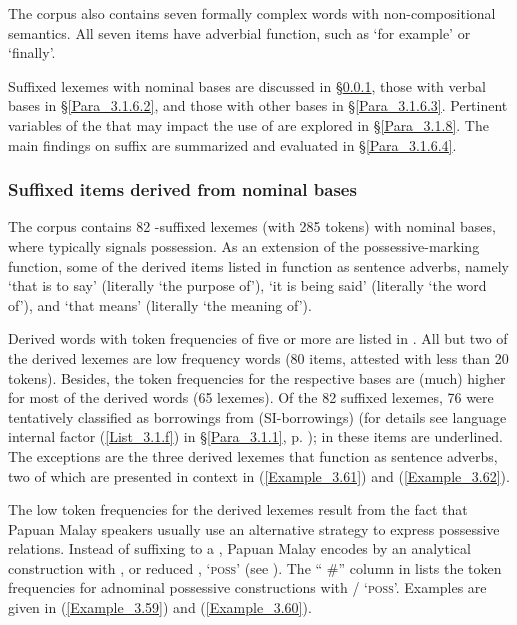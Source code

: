 The corpus also contains seven formally complex words with non-composi\-tion\-al semantics. All seven items have adverbial function, such as  ‘for example’ or  ‘finally’.



Suffixed lexemes with nominal bases are discussed in §\ref{Para_3.1.6.1}, those with verbal bases in §\ref{Para_3.1.6.2}, and those with other bases in §\ref{Para_3.1.6.3}. Pertinent variables of the  that may impact the use of  are explored in §\ref{Para_3.1.8}. The main findings on suffix  are summarized and evaluated in §\ref{Para_3.1.6.4}.


\subsubsection[Suffixed items derived from nominal bases]{Suffixed items derived from nominal bases}\label{Para_3.1.6.1}

The corpus contains 82 -suffixed lexemes (with 285 tokens) with nominal bases, where  typically signals possession. As an extension of the possessive-marking function, some of the derived items listed in  function as sentence adverbs, namely  ‘that is to say’ (literally ‘the purpose of’),  ‘it is being said’ (literally ‘the word of’), and  ‘that means’ (literally ‘the meaning of’).



Derived words with token frequencies of five or more are listed in . All but two of the derived lexemes are low frequency words (80 items, attested with less than 20 tokens). Besides, the token frequencies for the respective bases are (much) higher for most of the derived words (65 lexemes). Of the 82 suffixed lexemes, 76 were tentatively classified as borrowings from  (SI-borrowings) (for details see language internal factor (\ref{List_3.1.f}) in §\ref{Para_3.1.1}, p. \pageref{List_3.1.f}); in  these items are underlined. The exceptions are the three derived lexemes that function as sentence adverbs, two of which are presented in context in (\ref{Example_3.61}) and (\ref{Example_3.62}).



The low token frequencies for the derived lexemes result from the fact that Papuan Malay speakers usually use an alternative strategy to express possessive relations. Instead of suffixing  to a , Papuan Malay encodes  by an analytical construction with , or reduced , ‘\textsc{poss}’ (see ). The `` \#'' column in  lists the token frequencies for adnominal possessive constructions with / ‘\textsc{poss}’. Examples are given in (\ref{Example_3.59}) and (\ref{Example_3.60}).

